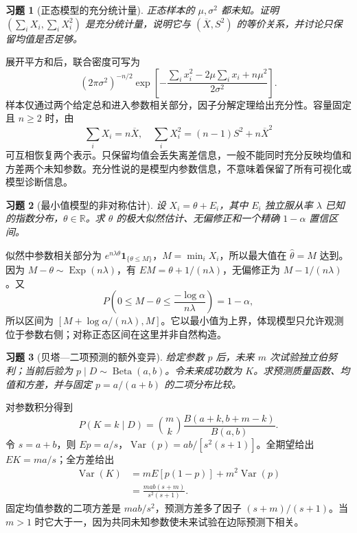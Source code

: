 \documentclass[12pt,fontset=fandol]{ctexart}
\newtheorem{exercise}{习题}[section]
\begin{document}
\begin{exercise}[正态模型的充分统计量]\label{q:B17.12}
正态样本的 $\mu,\sigma^2$ 都未知。证明 $(\sum_iX_i,\sum_iX_i^2)$ 是充分统计量，说明它与 $(\overline X,S^2)$ 的等价关系，并讨论只保留均值是否足够。\par{}
\end{exercise}

\begin{solve}\label{a:B17.12}展开平方和后，联合密度可写为\[(2\pi\sigma^2)^{-n/2}\exp\left[-\frac{\sum_i x_i^2-2\mu\sum_i x_i+n\mu^2}{2\sigma^2}\right].\]样本仅通过两个给定总和进入参数相关部分，因子分解定理给出充分性。容量固定且 $n\ge2$ 时，由\[\sum_iX_i=n\overline X,\quad\sum_iX_i^2=(n-1)S^2+n\overline X^2\]可互相恢复两个表示。只保留均值会丢失离差信息，一般不能同时充分反映均值和方差两个未知参数。充分性说的是模型内参数信息，不意味着保留了所有可视化或模型诊断信息。\end{solve}

\begin{exercise}[最小值模型的非对称估计]\label{q:B17.13}
设 $X_i=\theta+E_i$，其中 $E_i$ 独立服从率 $\lambda$ 已知的指数分布，$\theta\in\mathbb R$。求 $\theta$ 的极大似然估计、无偏修正和一个精确 $1-\alpha$ 置信区间。\par{}
\end{exercise}

\begin{solve}\label{a:B17.13}似然中参数相关部分为 $e^{n\lambda\theta}\mathbf1_{\{\theta\le M\}}$，$M=\min_iX_i$，所以最大值在 $\widehat\theta=M$ 达到。因为 $M-\theta\sim\operatorname{Exp}(n\lambda)$，有 $EM=\theta+1/(n\lambda)$，无偏修正为 $M-1/(n\lambda)$。又\[P\left(0\le M-\theta\le\frac{-\log\alpha}{n\lambda}\right)=1-\alpha,\]所以区间为 $[M+\log\alpha/(n\lambda),M]$。它以最小值为上界，体现模型只允许观测位于参数右侧；对称正态区间在这里并非自然构造。\end{solve}

\begin{exercise}[贝塔—二项预测的额外变异]\label{q:B17.14}
给定参数 $p$ 后，未来 $m$ 次试验独立伯努利；当前后验为 $p\mid D\sim\operatorname{Beta}(a,b)$。令未来成功数为 $K$。求预测质量函数、均值和方差，并与固定 $p=a/(a+b)$ 的二项分布比较。\par{}
\end{exercise}

\begin{solve}\label{a:B17.14}对参数积分得到\[P(K=k\mid D)=\binom mk\frac{B(a+k,b+m-k)}{B(a,b)}.\]令 $s=a+b$，则 $Ep=a/s$，$\operatorname{Var}(p)=ab/[s^2(s+1)]$。全期望给出 $EK=ma/s$；全方差给出\[\begin{aligned}\operatorname{Var}(K)&=mE[p(1-p)]+m^2\operatorname{Var}(p)\\&=\frac{mab(s+m)}{s^2(s+1)}.\end{aligned}\]固定均值参数的二项方差是 $mab/s^2$，预测方差多了因子 $(s+m)/(s+1)$。当 $m>1$ 时它大于一，因为共同未知参数使未来试验在边际预测下相关。\end{solve}
\end{document}
